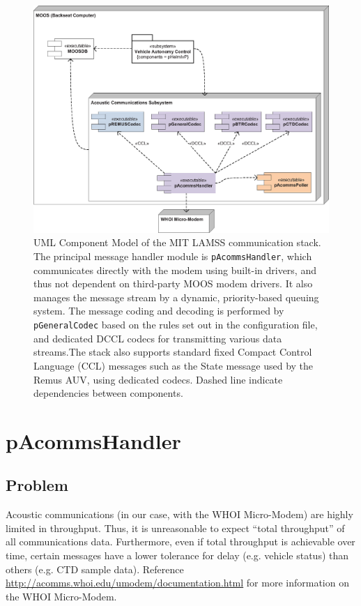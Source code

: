 \documentclass[11pt, letterpaper, oneside]{memoir}
\begin{document}
\begin{figure}[tp]
  \centering 
  \includegraphics[width=\textwidth]{acomms_component.eps}
  \caption{UML Component Model of the MIT LAMSS communication stack. The principal
  message handler module is \texttt{pAcommsHandler}, which communicates
  directly with the modem using built-in drivers, and thus not
  dependent on third-party MOOS modem drivers. It also manages the
  message stream by a dynamic, priority-based queuing system. The
  message coding and decoding is performed by \texttt{pGeneralCodec} based on
  the rules set out in the configuration file, and dedicated DCCL
  codecs for transmitting various data streams.The stack also
  supports standard fixed Compact Control Language (CCL) messages such
  as the State message used by the Remus AUV, using dedicated codecs. Dashed line indicate dependencies between components. \label{lamss_comms}}
\end{figure}

\section{pAcommsHandler}
\label{sec:pacommshandler} 


\subsection{Problem}
Acoustic communications (in our case, with the WHOI Micro-Modem) are highly limited in throughput. Thus, it is unreasonable to expect ``total throughput'' of all communications data. Furthermore, even if total throughput is achievable over time, certain messages have a lower tolerance for delay (e.g. vehicle status) than others (e.g. CTD sample data). Reference  \url{http://acomms.whoi.edu/umodem/documentation.html} for more information on the WHOI Micro-Modem.
\end{document}
